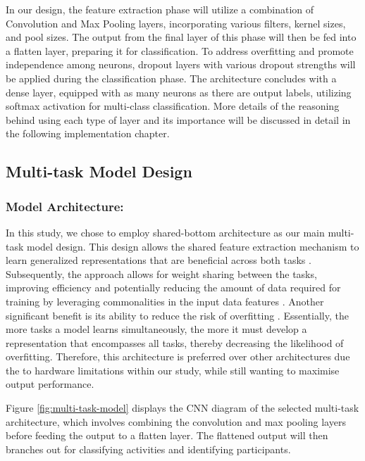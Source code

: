 \documentclass{l4proj}
\begin{document}
In our design, the feature extraction phase will utilize a combination of Convolution and Max Pooling layers, incorporating various filters, kernel sizes, and pool sizes. The output from the final layer of this phase will then be fed into a flatten layer, preparing it for classification. To address overfitting and promote independence among neurons, dropout layers with various dropout strengths will be applied during the classification phase. The architecture concludes with a dense layer, equipped with as many neurons as there are output labels, utilizing softmax activation for multi-class classification. More details of the reasoning behind using each type of layer and its importance will be discussed in detail in the following implementation chapter.

\subsection{Multi-task Model Design} \label{multi-task_model_design}
\subsubsection{Model Architecture:}
In this study, we chose to employ shared-bottom architecture as our main multi-task model design. This design allows the shared feature extraction mechanism to learn generalized representations that are beneficial across both tasks \citep{multi-task_learning_for_collaborative_filtering}. Subsequently, the approach allows for weight sharing between the tasks, improving efficiency and potentially reducing the amount of data required for training by leveraging commonalities in the input data features \citep{multi-task_architectures}. Another significant benefit is its ability to reduce the risk of overfitting \citep{overview_of_MLT_networks}. Essentially, the more tasks a model learns simultaneously, the more it must develop a representation that encompasses all tasks, thereby decreasing the likelihood of overfitting. Therefore, this architecture is preferred over other architectures due the to hardware limitations within our study, while still wanting to maximise output performance.

Figure \ref{fig:multi-task-model} displays the CNN diagram of the selected multi-task architecture, which involves combining the convolution and max pooling layers before feeding the output to a flatten layer. The flattened output will then branches out for classifying activities and identifying participants.
\end{document}
